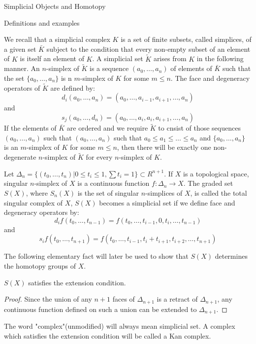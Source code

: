 \documentclass[a4,20pt,twosides]{book}
\begin{document}
\begin{chapter}{Simplicial Objects and Homotopy}
\begin{section}{Definitions and examples}
\begin{example}
	We recall that a simplicial complex $K$ is a set of finite subsets, called simplices, of a given set $\bar{K}$ subject to the condition that every non-empty subset of an element of $K$ is itself an element of $K$. A simplicial set $\tilde{K}$ arises from $K$ in the following manner. An $n$-simplex of $\tilde{K}$ is a sequence $(a_0 , \dots, a_n)$ of elements of $\bar{K}$ such that the set $\{ a_0, \dots, a_n\}$ is n $m$-simplex of $K$ for some $m \leq n$. The face and degeneracy operators of $\tilde{K}$ are defined by:
	\[ d_i(a_0, \dots, a_n)= (a_0, \dots, a_{i-1}, a_{i+1},\dots, a_n)
	\]
	and
	\[
	s_j (a_0,\dots, d_n) = (a_0, \dots, a_i, a_i,a_{i+1},\dots,a_n)
	\]
	If the elements of $\bar{K}$ are ordered and we require  $\tilde{K}$ to cnsist of those sequences $(a_0, \dots,a_n)$ such that $(a_0,\dots, a_n)$ such that $a_0 \leq a_1 \leq \dots \leq a_n$ and $\{ a_0, \dots, a_n\}$ is an $m$-simplex of $K$ for some $m \leq n$, then there will be exactly one non-degenerate $n$-simplex of $\tilde{K}$ for every $n$-simplex of $K$.
\end{example}

\begin{example}
	Let $\Delta_n = \{(t_0, \dots, t_n) | 0 \leq t_i \leq 1, \sum t_i =1\} \subset R^{n+1}$. If $X$ is a topological space, singular $n$-simplex of $X$ is a continuous function $f: \Delta_n \rightarrow X$. The graded set $S(X)$, where $S_n(X)$ is the set of singular $n$-simplices of $X$, is called the total singular complex of $X$, $S(X)$ becomes a simplicial set if we define face and degeneracy operators by:
	\[
	d_i f (t_0, \dots, t_{n-1}) = f( t_0, \dots, t_{i-1},0, t_i,\dots,t_{n-1})
	\]
	and 
	\[
	s_i f (t_0, \dots, t_{n+1}) = f(t_0, \dots, t_{i-1}, t_i + t_{i+1}, t_{i+2},\dots, t_{n+1})
	\]
\end{example}
The following elementary fact will later be used to show that $S(X)$ determines the homotopy groups of $X$.
\begin{chlemma}
	$S(X)$ satisfies the extension condition.
\end{chlemma}
\begin{proof}
	Since the union of any $n+1$ faces of $\Delta_{n+1}$ is a retract of $\Delta_{n+1}$, any continuous function defined on such a union can be extended to $\Delta_{n+1}$.
\end{proof}

\begin{conve}
	The word "complex"(unmodified) will always mean simplicial set. A complex which satisfies the extension condition will be called a Kan complex.
\end{conve}
\end{section}


\end{chapter}
\end{document}
